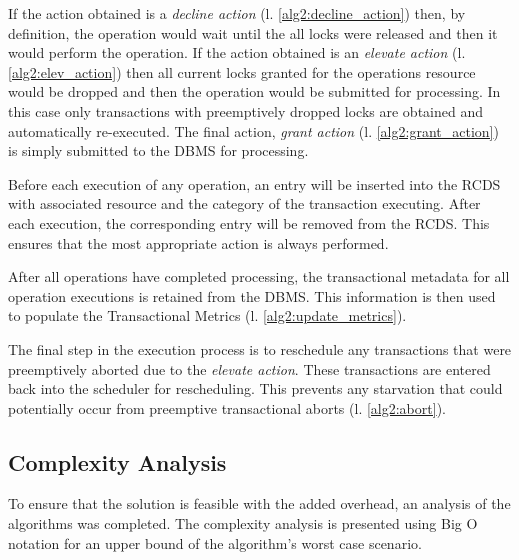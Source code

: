 \documentclass[conference]{IEEEtran}
\begin{document}
If the action obtained is a \textit{decline action} (l. \ref{alg2:decline_action}) then, by definition, the operation would wait until the all locks were released and then it would perform the operation. If the action obtained is an \textit{elevate action} (l. \ref{alg2:elev_action}) then all current locks granted for the operations resource would be dropped and then the operation would be submitted for processing. In this case only transactions with preemptively dropped locks are obtained and automatically re-executed. The final action, \textit{grant action} (l. \ref{alg2:grant_action}) is simply submitted to the DBMS for processing. 


Before each execution of any operation, an entry will be inserted into the RCDS with associated resource and the category of the transaction executing. After each execution, the corresponding entry will be removed from the RCDS. This ensures that the most appropriate action is always performed.

After all operations have completed processing, the transactional metadata for all operation executions is retained from the DBMS. This information is then used to populate the Transactional Metrics (l. \ref{alg2:update_metrics}). 


The final step in the execution process is to reschedule any transactions that were preemptively aborted due to the \textit{elevate action}. These transactions are entered back into the scheduler for rescheduling. This prevents any starvation that could potentially occur from preemptive transactional aborts (l. \ref{alg2:abort}).

\subsection{Complexity Analysis}
To ensure that the solution is feasible with the added overhead, an analysis of the algorithms was completed. The complexity analysis is presented using Big O notation for an upper bound of the algorithm's worst case scenario.
\end{document}
